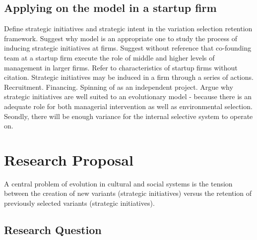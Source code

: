 \documentclass[12pt,letterpaper]{article}
\begin{document}
\subsection{Applying on the  \cite{Lovas2000} model in a startup firm}
Define strategic initiatives and strategic intent in the variation selection retention framework. Suggest why \cite{Lovas2000} model is an appropriate one to study the process of inducing strategic initiatives at firms. Suggest without reference that co-founding team at a startup firm execute the role of middle and higher levels of management in larger firms. Refer to characteristics of startup firms without citation. Strategic initiatives may be induced in a firm through a series of actions. Recruitment. Financing. Spinning of as an independent project.
Argue why strategic initiatives are well suited to an evolutionary model - because there is an adequate role for both managerial intervention as well as environmental selection. Seondly, there will be enough variance for the internal selective system to operate
on.

\section{Research Proposal}
A central problem of evolution in cultural and social systems is the tension between the creation of new variants (strategic initiatives) versus the retention of previously selected variants (strategic initiatives).
\subsection{Research Question}
\end{document}
